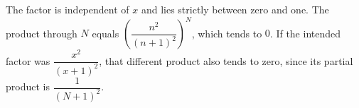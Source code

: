 The factor is independent of $x$ and lies strictly between zero and one. The product through $N$ equals $\left(\dfrac{n^2}{(n+1)^2}\right)^N$, which tends to $\boxed 0$. If the intended factor was $\dfrac{x^2}{(x+1)^2}$, that different product also tends to zero, since its partial product is $\dfrac{1}{(N+1)^2}$.

